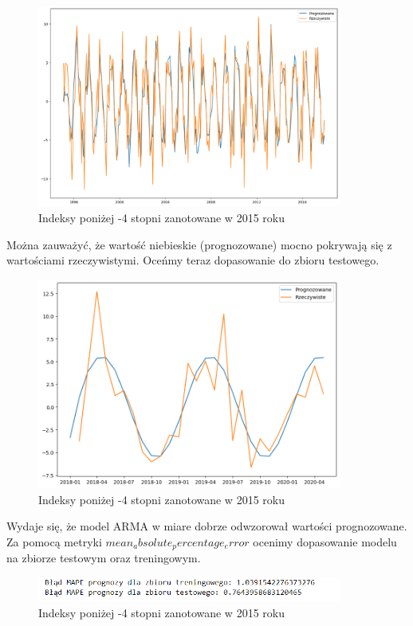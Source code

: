 \documentclass[12pt]{mwart}
\begin{document}
 \begin{figure}[h]
	
	\includegraphics[width=10cm]{dopasowanie.png}
	\caption{Indeksy poniżej -4 stopni zanotowane w 2015 roku}
	
\end{figure}

Można zauważyć, że wartość niebieskie (prognozowane) mocno pokrywają się z wartościami rzeczywistymi. Oceńmy teraz dopasowanie do zbioru testowego.\\

 \begin{figure}[h]
	
	\includegraphics[width=10cm]{dopasowanie1.png}
	\caption{Indeksy poniżej -4 stopni zanotowane w 2015 roku}
	
\end{figure}

\newpage 

Wydaje się, że model ARMA w miare dobrze odwzorował wartości prognozowane. Za pomocą metryki $mean_absolute_percentage_error$ ocenimy dopasowanie modelu na zbiorze testowym oraz treningowym.\\

\begin{figure}[h]
	
	\includegraphics[width=10cm]{blad.png}
	\caption{Indeksy poniżej -4 stopni zanotowane w 2015 roku}
	
\end{figure}
\end{document}
